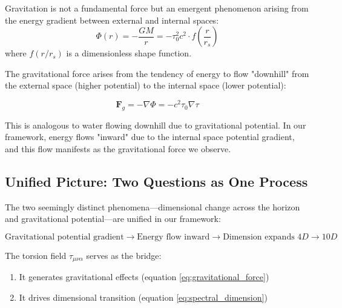 \begin{hypothesis}
Gravitation is not a fundamental force but an emergent phenomenon arising from the energy gradient between external and internal spaces:
\begin{equation}
    \Phi(r) = -\frac{GM}{r} = -\tau_0^2 c^2 \cdot f\left(\frac{r}{r_s}\right)
    \label{eq:gravity_as_potential}
\end{equation}
where $f(r/r_s)$ is a dimensionless shape function.
\end{hypothesis}

The gravitational force arises from the tendency of energy to flow "downhill" from the external space (higher potential) to the internal space (lower potential):

\begin{equation}
    \mathbf{F}_g = -\nabla\Phi = -c^2 \tau_0 \nabla\tau
    \label{eq:gravitational_force}
\end{equation}

\begin{remark}
This is analogous to water flowing downhill due to gravitational potential. In our framework, energy flows "inward" due to the internal space potential gradient, and this flow manifests as the gravitational force we observe.
\end{remark}

\subsection{Unified Picture: Two Questions as One Process}

The two seemingly distinct phenomena---dimensional change across the horizon and gravitational potential---are unified in our framework:

\begin{equation}
    \text{Gravitational potential gradient} \to \text{Energy flow inward} \to \text{Dimension expands } 4D \to 10D
    \label{eq:unified_process}
\end{equation}

The torsion field $\tau_{\mu\nu\alpha}$ serves as the bridge:
\begin{enumerate}
    \item It generates gravitational effects (equation \eqref{eq:gravitational_force})
    \item It drives dimensional transition (equation \eqref{eq:spectral_dimension})
\end{enumerate}

